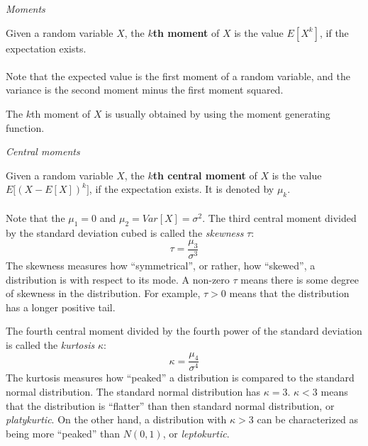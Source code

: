 \documentclass[12pt]{article}
\begin{document}
\textit{Moments}\\
\par
Given a random variable $X$, the \textbf{$k$th moment} of $X$ is the value $E[X^k]$, if the expectation exists.\\
\\
Note that the expected value is the first moment of a random variable, and the variance is the second moment minus the first moment squared.\\
\par
The $k$th moment of $X$ is usually obtained by using the moment generating function.
\par
\par
\textit{Central moments}\\
\par
Given a random variable $X$, the \textbf{$k$th central moment} of $X$ is the value $E\big[(X-E[X])^k\big]$, if the expectation exists.  It is denoted by $\mu_k$.\\
\\
Note that the $\mu_1=0$ and $\mu_2=Var[X]=\sigma^2$. The third central moment divided by the standard deviation cubed is called the \emph{skewness} $\tau$:  $$\tau=\frac{\mu_3}{\sigma^3}$$  The skewness measures how ``symmetrical'', or rather, how ``skewed'', a distribution is with respect to its mode.  A non-zero $\tau$ means there is some degree of skewness in the distribution.  For example, $\tau>0$ means that the distribution has a longer positive tail.  
\par
The fourth central moment divided by the fourth power of the standard deviation is called the \emph{kurtosis} $\kappa$:
$$\kappa=\frac{\mu_4}{\sigma^4}$$  The kurtosis measures how ``peaked'' a distribution is compared to the standard normal distribution.  The standard normal distribution has $\kappa=3$.  $\kappa<3$ means that the distribution is ``flatter'' than then standard normal distribution, or \emph{platykurtic}.  On the other hand, a distribution with $\kappa>3$ can be characterized as being more ``peaked'' than $N(0,1)$, or \emph{leptokurtic}.
\end{document}

